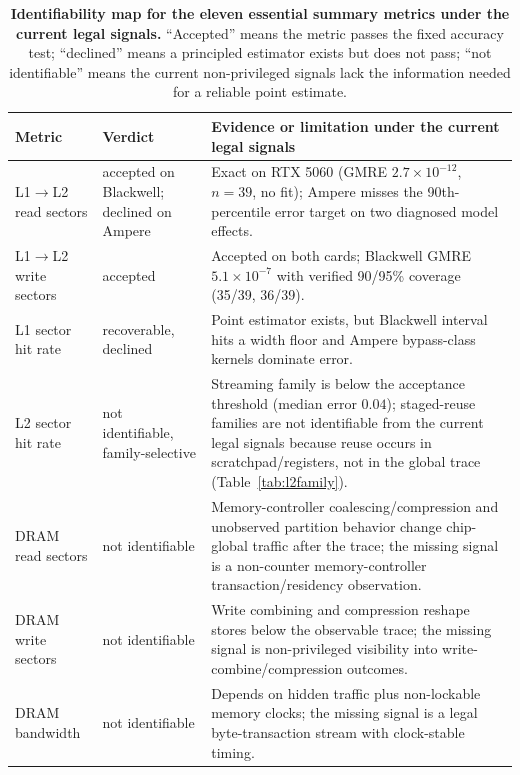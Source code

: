 \documentclass[conference]{IEEEtran}
\begin{document}
\begin{table}[t]
\centering
\caption{\textbf{Identifiability map for the eleven essential summary
metrics under the current legal signals.} ``Accepted'' means the metric
passes the fixed accuracy test; ``declined'' means a principled estimator
exists but does not pass; ``not identifiable'' means the current
non-privileged signals lack the information needed for a reliable point
estimate.}
\label{tab:metricmap}
\setlength{\tabcolsep}{3pt}
\renewcommand{\arraystretch}{0.96}
\scriptsize
\begin{tabular}{@{}p{3.0cm}p{2.3cm}>{\raggedright\arraybackslash}p{11.0cm}@{}}
\toprule
\textbf{Metric} & \textbf{Verdict} & \textbf{Evidence or limitation under the current legal signals} \\
\midrule
L1$\rightarrow$L2 read sectors & \textcolor{recblue}{accepted} on Blackwell; declined on Ampere &
Exact on RTX 5060 (GMRE $2.7{\times}10^{-12}$, $n{=}39$, no fit);
Ampere misses the 90th-percentile error target on two diagnosed model effects.\\
L1$\rightarrow$L2 write sectors & \textcolor{recblue}{accepted} &
Accepted on both cards; Blackwell GMRE $5.1{\times}10^{-7}$ with
verified 90/95\% coverage (35/39, 36/39).\\
L1 sector hit rate & recoverable, declined &
Point estimator exists, but Blackwell interval hits a width floor and
Ampere bypass-class kernels dominate error.\\
L2 sector hit rate & not identifiable, family-selective &
Streaming family is below the acceptance threshold (median error $0.04$);
staged-reuse families are not identifiable from the current legal signals because reuse occurs in
scratchpad/registers, not in the global trace (Table~\ref{tab:l2family}).\\
DRAM read sectors & not identifiable &
Memory-controller coalescing/compression and unobserved partition behavior
change chip-global traffic after the trace; the missing signal is a non-counter
memory-controller transaction/residency observation.\\
DRAM write sectors & not identifiable &
Write combining and compression reshape stores below the observable trace;
the missing signal is non-privileged visibility into write-combine/compression
outcomes.\\
DRAM bandwidth & not identifiable &
Depends on hidden traffic plus non-lockable memory clocks; the missing signal is a
legal byte-transaction stream with clock-stable timing.\\

\end{tabular}
\end{table}
\end{document}
